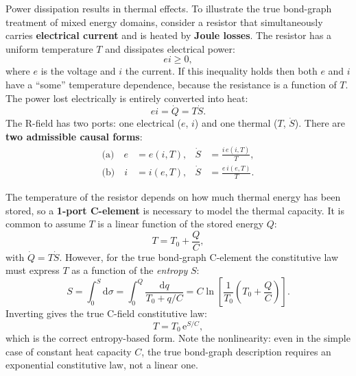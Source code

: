 Power dissipation results in thermal effects.  To illustrate the true
bond-graph treatment of mixed energy domains, consider a resistor that
simultaneously carries \textbf{electrical current} and is heated by
\textbf{Joule losses}.  The resistor has a uniform temperature $T$ and
dissipates electrical power:
\begin{equation}
  ei \geq 0,
  \label{eq:joule_positive}
\end{equation}
where $e$ is the voltage and $i$ the current.  If this inequality holds
then both $e$ and $i$ have a ``some'' temperature dependence, because the
resistance is a function of $T$.  The power lost electrically is entirely
converted into heat:
\begin{equation}
  ei = \dot{Q} = T\dot{S}.
  \label{eq:joule_to_heat}
\end{equation}
The R-field has two ports: one electrical ($e$, $i$) and one thermal ($T$,
$\dot{S}$).  There are \textbf{two admissible causal forms}:
\begin{align}
  \text{(a)}\quad e &= e(i, T), &\dot{S} &= \frac{i\,e(i,T)}{T},
  \label{eq:R_causal_a}\\
  \text{(b)}\quad i &= i(e, T), &\dot{S} &= \frac{e\,i(e,T)}{T}.
  \label{eq:R_causal_b}
\end{align}

The temperature of the resistor depends on how much thermal energy has been
stored, so a \textbf{1-port C-element} is necessary to model the thermal
capacity.  It is common to assume $T$ is a linear function of the stored
energy $Q$:
\begin{equation}
  T = T_{0} + \frac{Q}{C},
  \label{eq:T_linear_Q}
\end{equation}
with $\dot{Q} = T\dot{S}$.  However, for the true bond-graph C-element the
constitutive law must express $T$ as a function of the \emph{entropy} $S$:
\begin{equation}
  S = \int_{0}^{S}\mathrm{d}\sigma
  = \int_{0}^{Q}\frac{\mathrm{d}q}{T_{0} + q/C}
  = C\ln\!\left[\frac{1}{T_{0}}\!\left(T_{0} + \frac{Q}{C}\right)\right].
  \label{eq:S_from_Q}
\end{equation}
Inverting gives the true C-field constitutive law:
\begin{equation}
  T = T_{0}\,\mathrm{e}^{S/C},
  \label{eq:T_from_S}
\end{equation}
which is the correct entropy-based form.  Note the nonlinearity: even in
the simple case of constant heat capacity $C$, the true bond-graph
description requires an exponential constitutive law, not a linear one.

